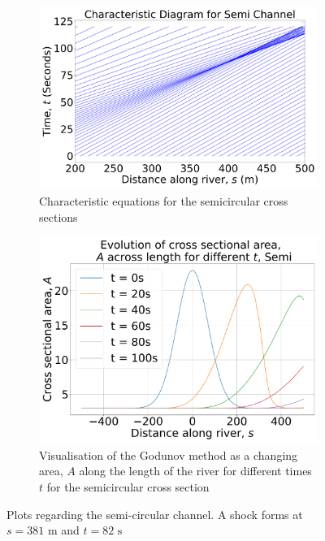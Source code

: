 \documentclass[12pt]{article}
\begin{document}
\begin{figure}[H]
    \centering
    \begin{subfigure}[b]{0.49\textwidth}
        \centering
        \includegraphics[width=\textwidth]{Figures/Semi_characteristic.pdf}
        \caption{Characteristic equations for the semicircular cross sections}
        \label{fig:semi_char}
    \end{subfigure}
    \hfill
    \begin{subfigure}[b]{0.49\textwidth}
        \centering
        \includegraphics[width=\textwidth]{Figures/Semi_godunov.pdf}
        \caption{Visualisation of the Godunov method as a changing area, $A$ along the length of the river for different times $t$ for the semicircular cross section}
        \label{fig:semi_godunov}
    \end{subfigure}
    \caption{Plots regarding the semi-circular channel. A shock forms at $s= 381\text{ m}$ and $t= 82\text{ s}$}
\end{figure}
\end{document}
